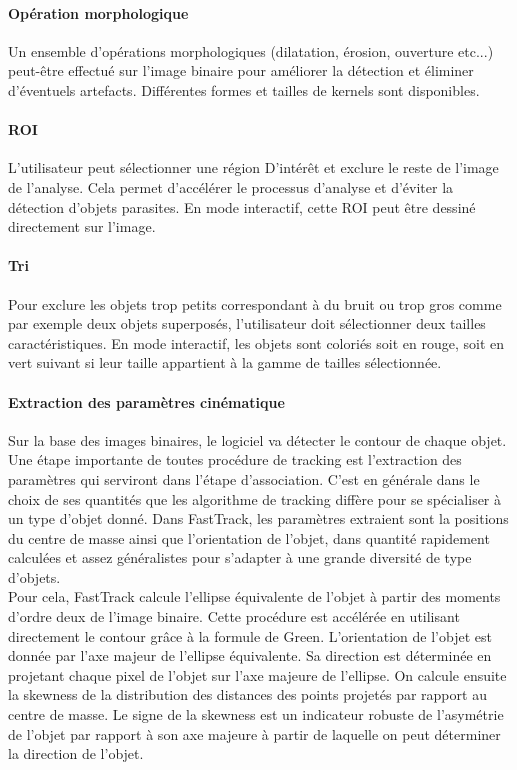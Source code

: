 		
		\paragraph{Opération morphologique}
		Un ensemble d'opérations morphologiques (dilatation, érosion, ouverture etc...) peut-être effectué sur l'image binaire pour améliorer la détection et éliminer d'éventuels artefacts. Différentes formes et tailles de kernels sont disponibles.
		
		
		\paragraph{ROI}
		L'utilisateur peut sélectionner une région D’intérêt et exclure le reste de l'image de l'analyse. Cela permet d'accélérer le processus d'analyse et d'éviter la détection d’objets parasites. En mode interactif, cette ROI peut être dessiné directement sur l'image.
		
		
		\paragraph{Tri}
		Pour exclure les objets trop petits correspondant à du bruit ou trop gros comme par exemple deux objets superposés, l’utilisateur doit sélectionner deux tailles caractéristiques. En mode interactif, les objets sont coloriés soit en rouge, soit en vert suivant si leur taille appartient à la gamme de tailles sélectionnée.
		
		\paragraph{Extraction des paramètres cinématique}
		Sur la base des images binaires, le logiciel va détecter le contour de chaque objet. Une étape importante de toutes procédure de tracking est l'extraction des paramètres qui serviront dans l'étape d'association. C'est en générale dans le choix de ses quantités que les algorithme de tracking diffère pour se spécialiser à un type d'objet donné. Dans FastTrack, les paramètres extraient sont la positions du centre de masse ainsi que l'orientation de l’objet, dans quantité rapidement calculées et assez généralistes pour s'adapter à une grande diversité de type d'objets.\\
		
		Pour cela, FastTrack calcule l'ellipse équivalente de l'objet à partir des moments d'ordre deux de l'image binaire. Cette procédure est accélérée en utilisant directement le contour grâce à la formule de Green. L'orientation de l'objet est donnée par l'axe majeur de l'ellipse équivalente. Sa direction est déterminée en projetant chaque pixel de l'objet sur l'axe majeure de l'ellipse. On calcule ensuite la skewness de la distribution des distances des points projetés par rapport au centre de masse. Le signe de la skewness est un indicateur robuste de l’asymétrie de l'objet par rapport à son axe majeure à partir de laquelle on peut déterminer la direction de l'objet.\\
		
